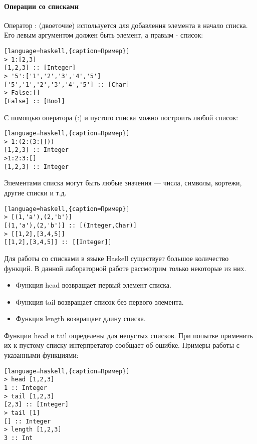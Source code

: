 \documentclass[a4paper,12pt]{article}
\begin{document}
\paragraph{Операции со списками}
Оператор : (двоеточие) используется для добавления элемента в начало списка. Его левым аргументом должен быть элемент, а правым - список:

\begin{lstlisting}[language=haskell,{caption=Пример}]
> 1:[2,3]
[1,2,3] :: [Integer]
> '5':['1','2','3','4','5']
['5','1','2','3','4','5'] :: [Char]
> False:[]
[False] :: [Bool]
\end{lstlisting}

С помощью оператора (:) и пустого списка можно построить любой список:

\begin{lstlisting}[language=haskell,{caption=Пример}]
> 1:(2:(3:[]))
[1,2,3] :: Integer
>1:2:3:[]
[1,2,3] :: Integer
\end{lstlisting}

Элементами списка могут быть любые значения — числа, символы, кортежи, другие списки и т.д.

\begin{lstlisting}[language=haskell,{caption=Пример}]
> [(1,'a'),(2,'b')]
[(1,'a'),(2,'b')] :: [(Integer,Char)]
> [[1,2],[3,4,5]]
[[1,2],[3,4,5]] :: [[Integer]]
\end{lstlisting}

Для работы со списками в языке Haskell существует большое количество функций. В данной лабораторной работе рассмотрим только некоторые из них.

\begin{itemize}
	\item Функция head возвращает первый элемент списка.
	\item Функция tail возвращает список без первого элемента.
	\item Функция length возвращает длину списка.
\end{itemize}

Функции head и tail определены для непустых списков. При попытке применить их к пустому списку интерпретатор сообщает об ошибке. Примеры работы с указанными функциями:

\begin{lstlisting}[language=haskell,{caption=Пример}]
> head [1,2,3]
1 :: Integer
> tail [1,2,3]
[2,3] :: [Integer]
> tail [1]
[] :: Integer
> length [1,2,3]
3 :: Int
\end{lstlisting}
\end{document}
